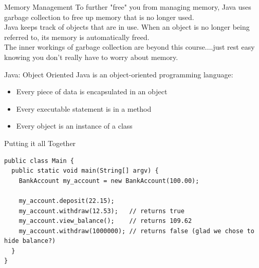 \documentclass{beamer}
\begin{document}
\begin{frame}[fragile]{Memory Management}
To further "free" you from managing memory, Java uses garbage collection to free up memory that is no longer used. \\
\vspace{0.5em}
Java keeps track of objects that are in use. When an object is no longer being referred to, its memory is automatically freed. \\
\vspace{0.5em}
The inner workings of garbage collection are beyond this course....just rest easy knowing you don't really have to worry about memory. \\
\end{frame}



\begin{frame}{Java: Object Oriented}
Java is an object-oriented programming language: \\
\begin{itemize}
\item Every piece of data is encapsulated in an object
\item Every executable statement is in a method
\item Every object is an instance of a class
\end{itemize}
\end{frame}



\begin{frame}[fragile]{Putting it all Together}
\centering
\begin{Verbatim}[fontsize=\tiny]
public class Main {
  public static void main(String[] argv) {
    BankAccount my_account = new BankAccount(100.00);
      
    my_account.deposit(22.15);
    my_account.withdraw(12.53);   // returns true
    my_account.view_balance();    // returns 109.62
    my_account.withdraw(1000000); // returns false (glad we chose to hide balance?)
  }
}
\end{Verbatim}
\end{frame}
\end{document}
